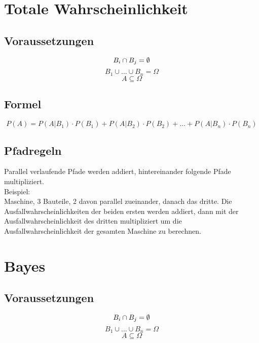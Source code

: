 \section{Totale Wahrscheinlichkeit}
\subsection{Voraussetzungen}
\begin{equation*}
	B_i \cap B_j = \emptyset\\
\end{equation*}
\begin{equation*}
	B_1 \cup \dots \cup B_n = \Omega
\end{equation*}
\begin{equation*}
	A \subseteq \Omega
\end{equation*}

\subsection{Formel}
\begin{equation}
	P(A) = P(A|B_1)\cdot P(B_1) + P(A|B_2) \cdot P(B_2) + \dots + P(A|B_n)\cdot P(B_n)
\end{equation}

\subsection{Pfadregeln}
Parallel verlaufende Pfade werden addiert, hintereinander folgende Pfade multipliziert.\\
Beispiel:\\
Maschine, 3 Bauteile, 2 davon parallel zueinander, danach das dritte. Die Ausfallwahrscheinlichkeiten der beiden ersten werden addiert, dann mit der Ausfallwahrscheinlichkeit des dritten multipliziert um die Ausfallwahrscheinlichkeit der gesamten Maschine zu berechnen.

\clearpage

\section{Bayes}
\subsection{Voraussetzungen}
\begin{equation*}
	B_i \cap B_j = \emptyset\\
\end{equation*}
\begin{equation*}
	B_1 \cup \dots \cup B_n = \Omega
\end{equation*}
\begin{equation*}
	A \subseteq \Omega
\end{equation*}

